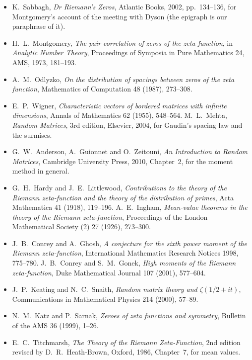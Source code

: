 \begin{itemize}
\item K.~Sabbagh, \emph{Dr Riemann's Zeros}, Atlantic Books, 2002, pp.~134--136, for Montgomery's account of the meeting with Dyson (the epigraph is
our paraphrase of it).
\item H.~L.~Montgomery, \emph{The pair correlation of zeros of the zeta function}, in \emph{Analytic Number Theory}, Proceedings of Symposia in Pure
Mathematics 24, AMS, 1973, 181--193.
\item A.~M.~Odlyzko, \emph{On the distribution of spacings between zeros of the zeta function}, Mathematics of Computation 48 (1987), 273--308.
\item E.~P.~Wigner, \emph{Characteristic vectors of bordered matrices with infinite dimensions}, Annals of Mathematics 62 (1955), 548--564.
M.~L.~Mehta, \emph{Random Matrices}, 3rd edition, Elsevier, 2004, for Gaudin's spacing law and the surmises.
\item G.~W.~Anderson, A.~Guionnet and O.~Zeitouni, \emph{An Introduction to Random Matrices}, Cambridge University Press, 2010, Chapter~2, for the
moment method in general.
\item G.~H.~Hardy and J.~E.~Littlewood, \emph{Contributions to the theory of the Riemann zeta-function and the theory of the distribution of primes},
Acta Mathematica 41 (1918), 119--196. A.~E.~Ingham, \emph{Mean-value theorems in the theory of the Riemann zeta-function}, Proceedings of the London
Mathematical Society (2) 27 (1926), 273--300.
\item J.~B.~Conrey and A.~Ghosh, \emph{A conjecture for the sixth power moment of the Riemann zeta-function}, International Mathematics Research
Notices 1998, 775--780. J.~B.~Conrey and S.~M.~Gonek, \emph{High moments of the Riemann zeta-function}, Duke Mathematical Journal 107 (2001), 577--604.
\item J.~P.~Keating and N.~C.~Snaith, \emph{Random matrix theory and $\zeta(1/2+it)$}, Communications in Mathematical Physics 214 (2000), 57--89.
\item N.~M.~Katz and P.~Sarnak, \emph{Zeroes of zeta functions and symmetry}, Bulletin of the AMS 36 (1999), 1--26.
\item E.~C.~Titchmarsh, \emph{The Theory of the Riemann Zeta-Function}, 2nd edition revised by D.~R.~Heath-Brown, Oxford, 1986, Chapter~7, for mean values.
\end{itemize}
